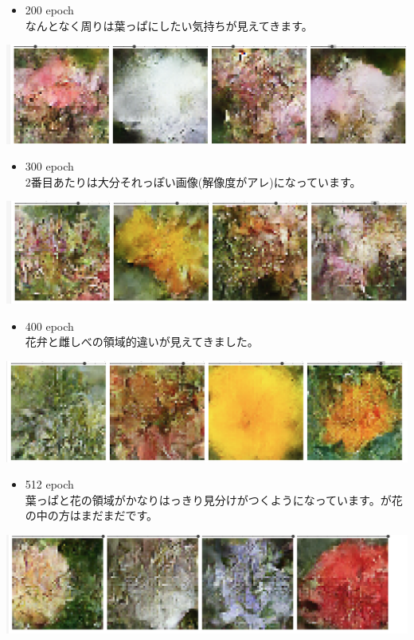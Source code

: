 \documentclass[dvipdfmx]{article}
\begin{document}
\begin{itemize}
\item 200 epoch\\
なんとなく周りは葉っぱにしたい気持ちが見えてきます。\\
\end{itemize}
\begin{center}
\includegraphics[width=0.75\linewidth]{./200epoch.png}
\end{center}

\begin{itemize}
\item 300 epoch\\
2番目あたりは大分それっぽい画像(解像度がアレ)になっています。\\
\end{itemize}
\begin{center}
\includegraphics[width=0.75\linewidth]{./300epoch.png}
\end{center}

\begin{itemize}
\item 400 epoch\\
花弁と雌しべの領域的違いが見えてきました。\\
\end{itemize}
\begin{center}
\includegraphics[width=0.75\linewidth]{./400epoch.png}
\end{center}

\begin{itemize}
\item 512 epoch\\
葉っぱと花の領域がかなりはっきり見分けがつくようになっています。が花の中の方はまだまだです。\\
\end{itemize}
\begin{center}
\includegraphics[width=0.8\linewidth]{./512epoch.png}
\end{center}
\end{document}
